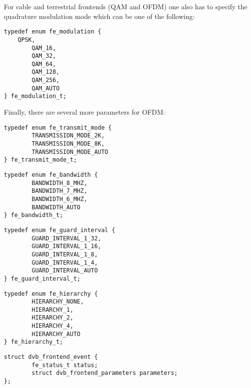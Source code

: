 \noindent 
For cable and terrestrial frontends (QAM and OFDM) one also has to 
specify the quadrature modulation mode which can be one of the following:
\begin{verbatim}
typedef enum fe_modulation {
	QPSK,
        QAM_16,
        QAM_32,
        QAM_64,
        QAM_128,
        QAM_256,
        QAM_AUTO
} fe_modulation_t;
\end{verbatim}

Finally, there are several more parameters for OFDM:
\begin{verbatim}
typedef enum fe_transmit_mode {
        TRANSMISSION_MODE_2K,
        TRANSMISSION_MODE_8K,
        TRANSMISSION_MODE_AUTO
} fe_transmit_mode_t;
\end{verbatim}

\begin{verbatim}
typedef enum fe_bandwidth {
        BANDWIDTH_8_MHZ,
        BANDWIDTH_7_MHZ,
        BANDWIDTH_6_MHZ,
        BANDWIDTH_AUTO
} fe_bandwidth_t;
\end{verbatim}

\begin{verbatim}
typedef enum fe_guard_interval {
        GUARD_INTERVAL_1_32,
        GUARD_INTERVAL_1_16,
        GUARD_INTERVAL_1_8,
        GUARD_INTERVAL_1_4,
        GUARD_INTERVAL_AUTO
} fe_guard_interval_t;
\end{verbatim}

\begin{verbatim}
typedef enum fe_hierarchy {
        HIERARCHY_NONE,
        HIERARCHY_1,
        HIERARCHY_2,
        HIERARCHY_4,
        HIERARCHY_AUTO
} fe_hierarchy_t;
\end{verbatim}


\label{frontendevents}

\begin{verbatim}
struct dvb_frontend_event {
        fe_status_t status;
        struct dvb_frontend_parameters parameters;
};
\end{verbatim}

\clearpage



